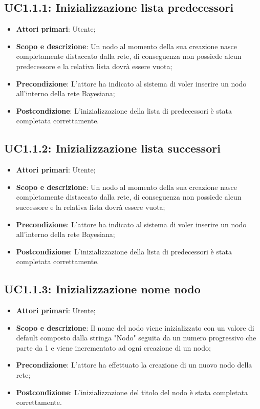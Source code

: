 \subsection{UC1.1.1: Inizializzazione lista predecessori} 
\hypertarget{UC1.1.1}{} 
\begin{itemize} 
	\item{\textbf{Attori primari}: Utente;} 
	\item{\textbf{Scopo e descrizione}: Un nodo al momento della sua creazione nasce completamente distaccato dalla rete, di conseguenza non possiede alcun predecessore e la relativa lista dovrà essere vuota;} 
	\item{\textbf{Precondizione}: L'attore ha indicato al sistema di voler inserire un nodo all'interno della rete Bayesiana;} 
	\item{\textbf{Postcondizione}: L'inizializzazione della lista di predecessori è stata completata correttamente.} 
\end{itemize} 
\subsection{UC1.1.2: Inizializzazione lista successori} 
\hypertarget{UC1.1.2}{} 
\begin{itemize} 
	\item{\textbf{Attori primari}: Utente;} 
	\item{\textbf{Scopo e descrizione}: Un nodo al momento della sua creazione nasce completamente distaccato dalla rete, di conseguenza non possiede alcun successore e la relativa lista dovrà essere vuota;} 
	\item{\textbf{Precondizione}: L'attore ha indicato al sistema di voler inserire un nodo all'interno della rete Bayesiana;} 
	\item{\textbf{Postcondizione}: L'inizializzazione della lista di predecessori è stata completata correttamente.} 
\end{itemize} 
\subsection{UC1.1.3: Inizializzazione nome nodo}
\hypertarget{UC1.1.3}{}  
\begin{itemize} 
	\item{\textbf{Attori primari}: Utente;} 
	\item{\textbf{Scopo e descrizione}: Il nome del nodo viene inizializzato con un valore di default composto dalla stringa "Nodo" seguita da un numero progressivo che parte da 1 e viene incrementato ad ogni creazione di un nodo;} 
	\item{\textbf{Precondizione}: L'attore ha effettuato la creazione di un nuovo nodo della rete;} 
	\item{\textbf{Postcondizione}: L'inizializzazione del titolo del nodo è stata completata correttamente.} 
\end{itemize} 

